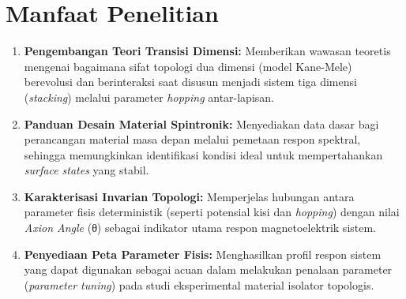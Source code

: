 \section{Manfaat Penelitian}
\begin{enumerate}
\item \textbf{Pengembangan Teori Transisi Dimensi:} Memberikan wawasan teoretis mengenai bagaimana sifat topologi dua dimensi (model Kane-Mele) berevolusi dan berinteraksi saat disusun menjadi sistem tiga dimensi (\textit{stacking}) melalui parameter \textit{hopping} antar-lapisan.
\item \textbf{Panduan Desain Material Spintronik:} Menyediakan data dasar bagi perancangan material masa depan melalui pemetaan respon spektral, sehingga memungkinkan identifikasi kondisi ideal untuk mempertahankan \textit{surface states} yang stabil.
\item \textbf{Karakterisasi Invarian Topologi:} Memperjelas hubungan antara parameter fisis deterministik (seperti potensial kisi dan \textit{hopping}) dengan nilai \textit{Axion Angle} (θ) sebagai indikator utama respon magnetoelektrik sistem.
\item \textbf{Penyediaan Peta Parameter Fisis:} Menghasilkan profil respon sistem yang dapat digunakan sebagai acuan dalam melakukan penalaan parameter (\textit{parameter tuning}) pada studi eksperimental material isolator topologis.
\end{enumerate}
